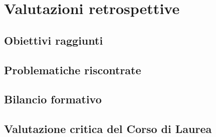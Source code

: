 
\chapter{Valutazioni retrospettive}
\label{cap:valutazioni-retrospettive}
\section{Obiettivi raggiunti}
\section{Problematiche riscontrate}




\section{Bilancio formativo}
\section{Valutazione critica del Corso di Laurea}
\newpage
